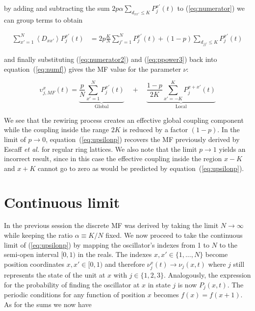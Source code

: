 \noindent by adding and subtracting the sum $2p\alpha\sum_{d_{xx'} \leq K}P_j^{x'}(t)$ to (\ref{eq:numerator}) we can group terms to
obtain

\begin{align}
    \sum_{x'=1}^N \left< D_{xx'} \right> P_j^{x'}(t) &= 2p\frac{K}{N}\sum_{j'=1}^N P_j^{x'}(t) + (1-p)\sum_{d_{jj'} \leq K} P_j^{x'}(t)
    \label{eq:numerator2}
\end{align}

\noindent and finally substituting (\ref{eq:numerator2}) and (\ref{eq:ppower3}) back into equation~(\ref{eq:numf}) gives the MF value
for the parameter $\nu$:

\begin{equation}
    \upsilon_{j,MF}^x(t) = \underbrace{\frac{p}{N}\sum_{x'=1}^N P_j^{x'}(t)}_{\text{Global}}
\quad + \quad \underbrace{\frac{1-p}{2K}\sum_{x'=-K}^K P_j^{x+x'}(t)}_{\text{Local}}
    \label{eq:upsilonp}
\end{equation}

We see that the rewiring process creates an effective global coupling component while the coupling inside the range $2K$ is reduced by
a factor $(1-p)$. In the limit of $p\to 0$, equation~(\ref{eq:upsilonp}) recovers the MF previously derived by Escaff \textit{et al.}
for regular ring lattices\cite{escaff2014arrays}. We also note that the limit $p\to 1$ yields an incorrect result, since in this case
the effective coupling inside the region $x-K$ and $x+K$ cannot go to zero as would be predicted by equation~(\ref{eq:upsilonp}).

\section{Continuous limit}

In the previous session the discrete MF was derived by taking the limit $N\to\infty$ while keeping the ratio $\alpha\equiv K/N$ fixed.
We now proceed to take the continuous limit of (\ref{eq:upsilonp}) by mapping the oscillator's indexes from 1 to $N$ to the semi-open
interval $[0,1)$ in the reals. The indexes $x,x' \in \{1,...,N\}$ become position coordinates $x,x'\in [0,1)$ and therefore $\nu^x_j(t)
\to \nu_j(x,t)$ where $j$ still represents the state of the unit at $x$ with $j\in\{1,2,3\}$. Analogously, the expression for the
probability of finding the oscillator at $x$ in state $j$ is now $P_j(x,t)$. The periodic conditions for any function of position $x$
becomes $f(x)=f(x+1)$. As for the sums we now have

